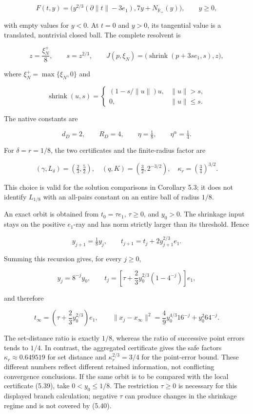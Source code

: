 \documentclass[11pt,a4paper]{article}
\theoremstyle{plain}
\theoremstyle{definition}
\theoremstyle{remark}
\begin{document}
\[
F(t,y)=\bigl(y^{2/3}(\partial\|t\|-3e_1),
7y+N_{\mathbb R_+}(y)\bigr),\qquad y\ge0,
\tag{5.37}
\]

with empty values for \(y<0\). At \(t=0\) and \(y>0\), its tangential
value is a translated, nontrivial closed ball. The complete resolvent is

\[
z=\frac{\xi_N^+}{8},\qquad s=z^{2/3},\qquad
J(p,\xi_N)=\bigl(\operatorname{shrink}(p+3se_1,s),z\bigr),
\tag{5.38}
\]

where \(\xi_N^+=\max\{\xi_N,0\}\) and

\[
\operatorname{shrink}(u,s)=
\begin{cases}
(1-s/\|u\|)u,&\|u\|>s,\\
0,&\|u\|\le s.
\end{cases}
\]

The native constants are

\[
d_D=2,\qquad R_D=4,\qquad\eta=\tfrac18,
\qquad\eta^\alpha=\tfrac14.
\]

For \(\delta=r=1/8\), the two certificates and the finite-radius factor
are

\[
(\gamma,L_\delta)=\left(\tfrac23,\tfrac52\right),
\quad
(q,K)=\left(\tfrac32,2^{-3/2}\right),
\quad
\kappa_r=\left(\tfrac34\right)^{3/2}.
\tag{5.39}
\]

This choice is valid for the solution comparisons in Corollary 5.3; it
does not identify \(L_{1/8}\) with an all-pairs constant on an entire
ball of radius \(1/8\).

An exact orbit is obtained from \(t_0=\tau e_1\), \(\tau\ge0\), and
\(y_0>0\). The shrinkage input stays on the positive \(e_1\)-ray and has
norm strictly larger than its threshold. Hence

\[
y_{j+1}=\tfrac18y_j,
\qquad t_{j+1}=t_j+2y_{j+1}^{2/3}e_1.
\]

Summing this recursion gives, for every \(j\ge0\),

\[
y_j=8^{-j}y_0,
\qquad
t_j=\left[\tau+\frac23y_0^{2/3}(1-4^{-j})\right]e_1,
\tag{5.40}
\]

and therefore

\[
t_\infty=\left(\tau+\frac23y_0^{2/3}\right)e_1,
\qquad
\|x_j-x_\infty\|^2
=\frac49y_0^{4/3}16^{-j}+y_0^2 64^{-j}.
\tag{5.41}
\]

The set-distance ratio is exactly \(1/8\), whereas the ratio of
successive point errors tends to \(1/4\). In contrast, the aggregated
certificate gives the safe factors \(\kappa_r\approx0.649519\) for set
distance and \(\kappa_r^{2/3}=3/4\) for the point-error bound. These
different numbers reflect different retained information, not
conflicting convergence conclusions. If the same orbit is to be compared
with the local certificate (5.39), take \(0<y_0\le1/8\). The restriction
\(\tau\ge0\) is necessary for this displayed branch calculation;
negative \(\tau\) can produce changes in the shrinkage regime and is not
covered by (5.40).
\end{document}
